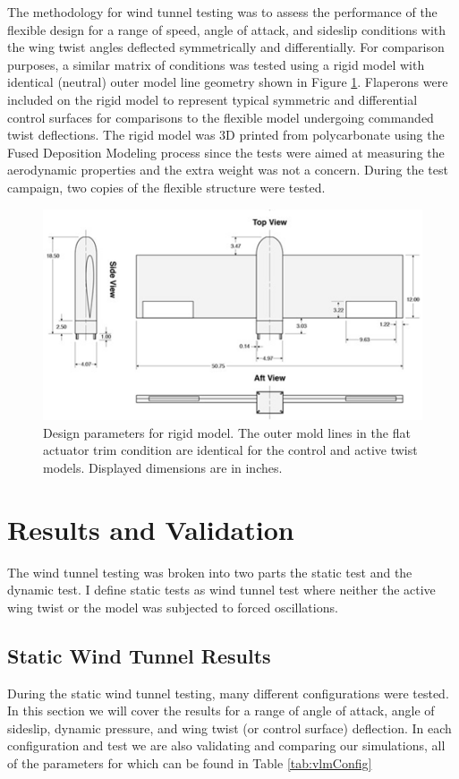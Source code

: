\documentclass[11pt]{ucthesis}
\begin{document}
The methodology for wind tunnel testing was to assess the performance of the flexible design for a range of speed, angle of attack, and sideslip conditions with the wing twist angles deflected symmetrically and differentially. For comparison purposes, a similar matrix of conditions was tested using a rigid model with identical (neutral) outer model line geometry shown in Figure \ref{fig:rigid}. Flaperons were included on the rigid model to represent typical symmetric and differential control surfaces for comparisons to the flexible model undergoing commanded twist deflections. The rigid model was 3D printed from polycarbonate using the Fused Deposition Modeling process since the tests were aimed at measuring the aerodynamic properties and the extra weight was not a concern. During the test campaign, two copies of the flexible structure were tested.

\begin{figure}[h]
\centering
\includegraphics[width=0.75\linewidth]{Figures/rigidModel.png}
\caption{Design parameters for rigid model. The outer mold lines in the flat actuator trim condition are identical for the control and active twist models. Displayed dimensions are in inches.}
\label{fig:rigid}
\end{figure}

\section{Results and Validation}
The wind tunnel testing was broken into two parts the static test and the dynamic test. I define static tests as wind tunnel test where neither the active wing twist or the model was subjected to forced oscillations. 
\subsection{Static Wind Tunnel Results}
During the static wind tunnel testing, many different configurations were tested. In this section we will cover the results for a range of angle of attack, angle of sideslip, dynamic pressure, and wing twist (or control surface) deflection. In each configuration and test we are also validating and comparing our simulations, all of the parameters for which can be found in Table \ref{tab:vlmConfig}
\end{document}
